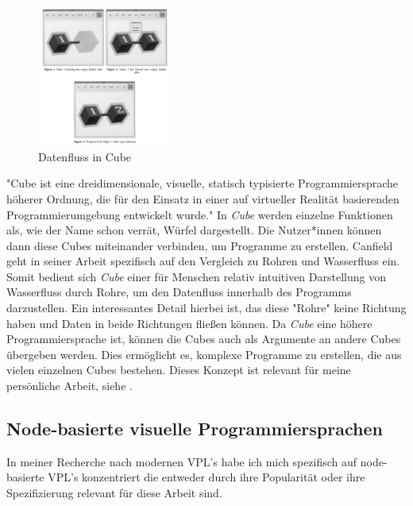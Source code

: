 \documentclass[ngerman]{article}
\begin{document}
\begingroup
\setlength\intextsep{2pt}

\begin{minipage}{\linewidth}
\begin{figure}
  \centering
  \includegraphics[width=0.4\textwidth]{./graphics/cube_vpl.png} %
  \caption{Datenfluss in Cube \cite{najork1996programming}}
  \label{fig:cube_demo}
\end{figure}
"Cube ist eine dreidimensionale, visuelle, statisch typisierte Programmiersprache höherer Ordnung, die für den Einsatz in einer auf virtueller Realität basierenden Programmierumgebung entwickelt wurde."  \cite{najork1996programming}
In \textit{Cube} werden einzelne Funktionen als, wie der Name schon verrät, Würfel dargestellt. Die Nutzer*innen können dann diese Cubes miteinander verbinden, um Programme zu erstellen.
Canfield geht in seiner Arbeit spezifisch auf den Vergleich zu Rohren und Wasserfluss ein. Somit bedient sich \textit{Cube} einer für Menschen relativ intuitiven Darstellung von Wasserfluss durch Rohre, um den Datenfluss innerhalb des Programms darzustellen.
Ein interessantes Detail hierbei ist, das diese "Rohre" keine Richtung haben und Daten in beide Richtungen fließen können. 
Da \textit{Cube} eine höhere Programmiersprache ist, können die Cubes auch als Argumente an andere Cubes übergeben werden. Dies ermöglicht es, komplexe Programme zu erstellen, die aus vielen einzelnen Cubes bestehen. 
\linebreak
\linebreak
Dieses Konzept ist relevant für meine persönliche Arbeit, siehe .

\end{minipage}
\endgroup
\pagebreak

\subsection{Node-basierte visuelle Programmiersprachen}
In meiner Recherche nach modernen VPL's habe ich mich spezifisch auf node-basierte VPL's konzentriert die entweder durch ihre Popularität oder ihre Spezifizierung relevant für diese Arbeit sind.
\end{document}
